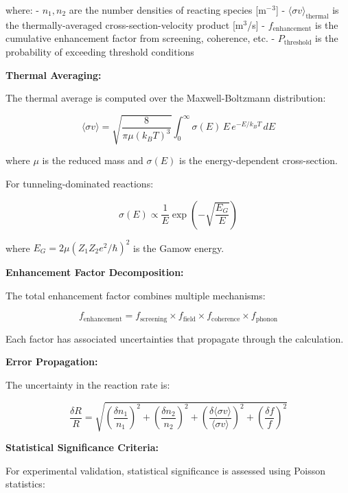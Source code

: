\documentclass[11pt,a4paper]{article}
\begin{document}
where: - $n_1, n_2$ are the number densities of reacting species {[}m$^{-}$$^{3}${]} - $\langle \sigma v \rangle_{\text{thermal}}$ is the thermally-averaged cross-section-velocity product {[}m$^{3}$/s{]} - $f_{\text{enhancement}}$ is the cumulative enhancement factor from screening, coherence, etc. - $P_{\text{threshold}}$ is the probability of exceeding threshold conditions

\textbf{Thermal Averaging:}

The thermal average is computed over the Maxwell-Boltzmann distribution:

\begin{equation}
\langle \sigma v \rangle = \sqrt{\frac{8}{\pi \mu (k_B T)^3}} \int_0^\infty \sigma(E) \, E \, e^{-E/k_B T} \, dE
\end{equation}

where $\mu$ is the reduced mass and $\sigma(E)$ is the energy-dependent cross-section.

For tunneling-dominated reactions:

\begin{equation}
\sigma(E) \propto \frac{1}{E} \exp\left(-\sqrt{\frac{E_G}{E}}\right)
\end{equation}

where $E_G = 2\mu (Z_1 Z_2 e^2 / \hbar)^2$ is the Gamow energy.

\textbf{Enhancement Factor Decomposition:}

The total enhancement factor combines multiple mechanisms:

\begin{equation}
f_{\text{enhancement}} = f_{\text{screening}} \times f_{\text{field}} \times f_{\text{coherence}} \times f_{\text{phonon}}
\end{equation}

Each factor has associated uncertainties that propagate through the calculation.

\textbf{Error Propagation:}

The uncertainty in the reaction rate is:

\begin{equation}
\frac{\delta R}{R} = \sqrt{\left(\frac{\delta n_1}{n_1}\right)^2 + \left(\frac{\delta n_2}{n_2}\right)^2 + \left(\frac{\delta \langle \sigma v \rangle}{\langle \sigma v \rangle}\right)^2 + \left(\frac{\delta f}{f}\right)^2}
\end{equation}

\textbf{Statistical Significance Criteria:}

For experimental validation, statistical significance is assessed using Poisson statistics:
\end{document}
